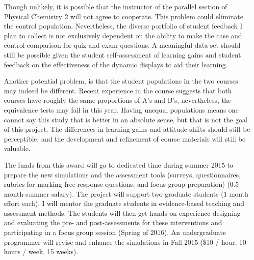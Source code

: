 \documentclass[10pt,letterpaper]{article}
\begin{document}

Though unlikely, it is possible that the instructor of the parallel section of Physical Chemistry 2 will not agree to cooperate. This problem could eliminate the control population. Nevertheless, the diverse portfolio of student feedback I plan to collect is not exclusively dependent on the ability to make the case and control comparison for quiz and exam questions. A meaningful data-set should still be possible given the student self-assessment of learning gains and student feedback on the effectiveness of the dynamic displays to aid their learning.

Another potential problem, is that the student populations in the two courses may indeed be different. Recent experience in the course suggests that both courses have roughly the same proportions of A's and B's, nevertheless, the equivalence tests may fail in this year. Having unequal populations means one cannot say this study  that \pogil is better in an absolute sense, but that is not the goal of this project. The differences in learning gains and attitude shifts should still be perceptible, and the development and refinement of course materials will still be valuable.


The funds from this award will go to dedicated time during summer 2015 to prepare the new simulations and the assessment tools (surveys, questionnaires, rubrics for marking free-response questions, and focus group preparation) (0.5 month summer salary). The project will support two graduate students (1 month effort each). I will mentor the graduate students in evidence-based teaching and assessment methods. The students will then get hands-on experience designing and evaluating the pre- and post-assessments for these interventions and participating in a focus group session (Spring of 2016). An undergraduate programmer will revise and enhance the simulations in Fall 2015 (\$10 / hour, 10 hours / week, 15 weeks).

\newpage
\raggedright\footnotesize\singlespacing
\renewcommand{\refname}{\large\textbf{References}}


% 

% 
\end{document}
